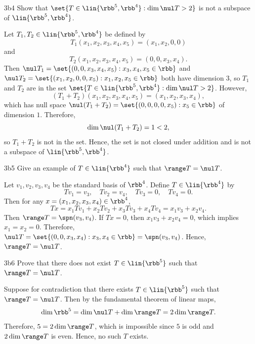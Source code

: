 \begin{exercise}{3b4}
    Show that $\set{T \in \lin{\rbb^5, \rbb^4} : \dim \nul T > 2}$ is not a subspace of $\lin{\rbb^5, \rbb^4}$.
\end{exercise}

\begin{sol}
    Let $T_1, T_2 \in \lin{\rbb^5, \rbb^4}$ be defined by
    \[
    	T_1(x_1, x_2, x_3, x_4, x_5) = (x_1, x_2, 0, 0)
    \]
    and
    \[
    	T_2(x_1, x_2, x_3, x_4, x_5) = (0, 0, x_3, x_4).
    \]
    Then $\nul T_1 = \set{(0, 0, x_3, x_4, x_5) : x_3, x_4, x_5 \in \rbb}$ and $\nul T_2 = \set{(x_1, x_2, 0, 0, x_5) : x_1, x_2, x_5 \in \rbb}$ both have dimension $3$, so $T_1$ and $T_2$ are in the set $\set{T \in \lin{\rbb^5, \rbb^4} : \dim \nul T > 2}$.
	However,
    \[
    	(T_1 + T_2)(x_1, x_2, x_3, x_4, x_5) = (x_1, x_2, x_3, x_4),
    \]
    which has null space $\nul(T_1 + T_2) = \set{(0, 0, 0, 0, x_5) : x_5 \in \rbb}$ of dimension $1$.
	Therefore,
    \[
    	\dim \nul(T_1 + T_2) = 1 < 2,
    \]
    so $T_1 + T_2$ is not in the set.
	Hence, the set is not closed under addition and is not a subspace of $\lin{\rbb^5, \rbb^4}$.
\end{sol}

\begin{exercise}{3b5}
    Give an example of $T \in \lin{\rbb^4}$ such that $\range T = \nul T$.
\end{exercise}

\begin{sol}
    Let $v_1, v_2, v_3, v_4$ be the standard basis of $\rbb^4$.
	Define $T \in \lin{\rbb^4}$ by
    \[
    	Tv_1 = v_3, \quad Tv_2 = v_4, \quad Tv_3 = 0, \quad Tv_4 = 0.
    \]
    Then for any $x = (x_1, x_2, x_3, x_4) \in \rbb^4$,
    \[
    	Tx = x_1 Tv_1 + x_2 Tv_2 + x_3 Tv_3 + x_4 Tv_4 = x_1 v_3 + x_2 v_4.
    \]
    Then $\range T = \spn(v_3, v_4)$.
	If $Tx = 0$, then $x_1 v_3 + x_2 v_4 = 0$, which implies $x_1 = x_2 = 0$.
	Therefore, $\nul T = \set{(0, 0, x_3, x_4) : x_3, x_4 \in \rbb} = \spn(v_3, v_4)$.
	Hence, $\range T = \nul T$.
\end{sol}

\begin{exercise}{3b6}
    Prove that there does not exist $T \in \lin{\rbb^5}$ such that $\range T = \nul T$.
\end{exercise}

\begin{sol}
    Suppose for contradiction that there exists $T \in \lin{\rbb^5}$ such that $\range T = \nul T$.
	Then by the fundamental theorem of linear maps,
    \[
    	\dim \rbb^5 = \dim \nul T + \dim \range T = 2\dim \range T.
    \]
    Therefore, $5 = 2\dim \range T$, which is impossible since $5$ is odd and $2\dim \range T$ is even.
	Hence, no such $T$ exists.
\end{sol}

